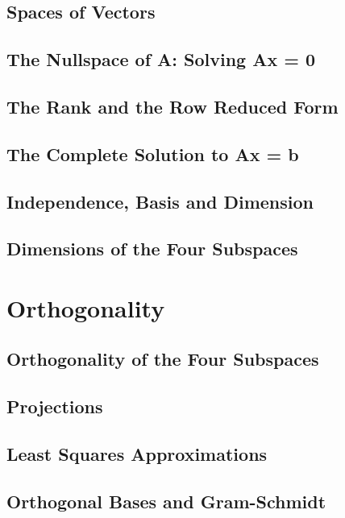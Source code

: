\documentclass{book}
\begin{document}
\section{Spaces of Vectors}

\section{The Nullspace of A: Solving Ax = 0}

\section{The Rank and the Row Reduced Form}

\section{The Complete Solution to Ax = b}

\section{Independence, Basis and Dimension}

\section{Dimensions of the Four Subspaces}










\chapter{Orthogonality}
\section{Orthogonality of the Four Subspaces}

\section{Projections}

\section{Least Squares Approximations}

\section{Orthogonal Bases and Gram-Schmidt}
\end{document}
